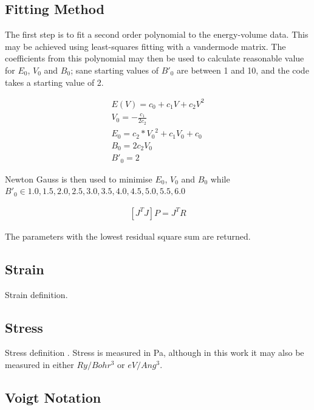 \subsection{Fitting Method}

The first step is to fit a second order polynomial to the energy-volume data.  This may be achieved using least-squares fitting with a vandermode matrix.  The coefficients from this polynomial may then be used to calculate reasonable value for $E_0$, $V_0$ and $B_0$; sane starting values of ${B'}_0$ are between 1 and 10, and the code takes a starting value of 2\cite{gilgamesheos}.

\begin{equation}
\begin{split}
E(V) = c_0 + c_1 V + c_2 V^2 \\
V_0 = -\frac{c_1}{2c_2} \\
E_0 = c_2 * {V_0}^2 + c_1 V_0 + c_0  \\
B_0 = 2 c_2 V_0 \\
{B'}_0 = 2
\end{split}
\label{eq:eqMurnachanEquationofStateVolume}
\end{equation}

Newton Gauss is then used to minimise $E_0$, $V_0$ and $B_0$ while ${B'}_0 \in {1.0,1.5,2.0,2.5,3.0,3.5,4.0,4.5,5.0,5.5,6.0}$

\begin{equation}
\begin{split}
\left[J^T J\right] P = J^T R
\end{split}
\label{eq:eqMurnachanEquationofStateVolume}
\end{equation}

The parameters with the lowest residual square sum are returned.




\subsection{Strain}

Strain definition.  

\subsection{Stress}

Stress definition .  Stress is measured in Pa, although in this work it may also be measured in either $Ry/Bohr^3$ or $eV/Ang^3$.


\subsection{Voigt Notation}

